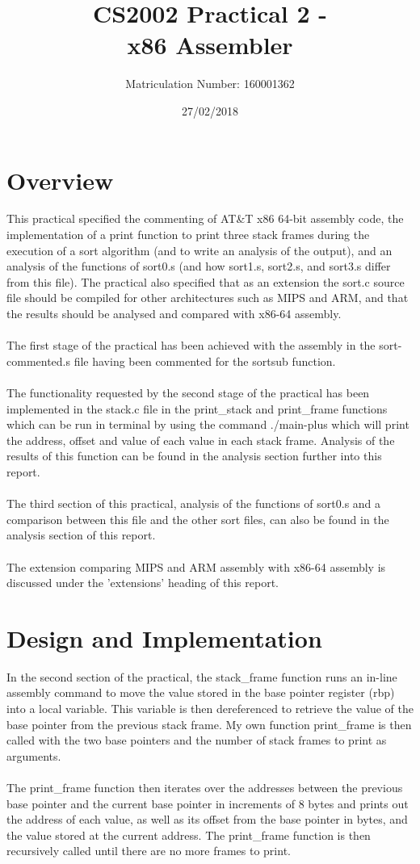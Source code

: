 \documentclass[11]{article}
\title{CS2002 Practical 2 - \\x86 Assembler}
\date{27/02/2018}
\author{Matriculation Number: 160001362}
\begin{document}
	\maketitle
	\newpage
	\tableofcontents
	
	\newpage
	\section{Overview}
	This practical specified the commenting of AT\&T x86 64-bit assembly code, the implementation of a print function to print three stack frames during the execution of a sort algorithm (and to write an analysis of the output), and an analysis of the functions of sort0.s (and how sort1.s, sort2.s, and sort3.s differ from this file). The practical also specified that as an extension the sort.c source file should be compiled for other architectures such as MIPS and ARM, and that the results should be analysed and compared with x86-64 assembly. \\\\The first stage of the practical has been achieved with the assembly in the sort-commented.s file having been commented for the sortsub function. \\\\The functionality requested by the second stage of the practical has been implemented in the stack.c file in the print\_stack and print\_frame functions which can be run in terminal by using the command ./main-plus which will print the address, offset and value of each value in each stack frame. Analysis of the results of this function can be found in the analysis section further into this report. \\\\ The third section of this practical, analysis of the functions of sort0.s and a comparison between this file and the other sort files, can also be found in the analysis section of this report. \\\\ The extension comparing MIPS and ARM assembly with x86-64 assembly is discussed under the 'extensions' heading of this report.
	\section{Design and Implementation}
	In the second section of the practical, the stack\_frame function runs an in-line assembly command to move the value stored in the base pointer register (rbp) into a local variable. This variable is then dereferenced to retrieve the value of the base pointer from the previous stack frame. My own function print\_frame is then called with the two base pointers and the number of stack frames to print as arguments. \\\\ The print\_frame function then iterates over the addresses between the previous base pointer and the current base pointer in increments of 8 bytes and prints out the address of each value, as well as its offset from the base pointer in bytes, and the value stored at the current address. The print\_frame function is then recursively called until there are no more frames to print.
\end{document}
